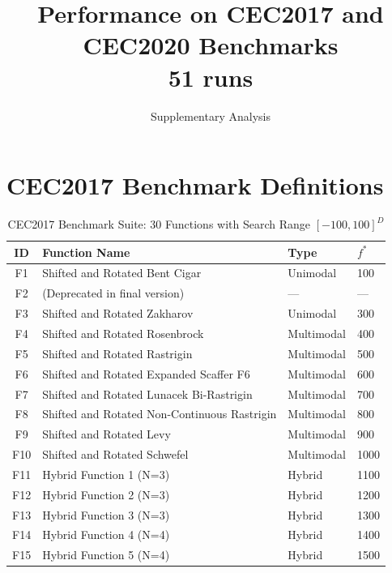 \documentclass[11pt]{article}
\title{Performance on CEC2017 and CEC2020 Benchmarks\\
\large 51 runs}
\author{Supplementary Analysis}
\date{}
\begin{document}
\maketitle


\section{CEC2017 Benchmark Definitions}

\begin{table}[ht]
\centering
\caption{CEC2017 Benchmark Suite: 30 Functions with Search Range $[-100, 100]^D$}
\label{tab:cec2017_functions}
\small
\begin{tabular}{@{}clll@{}}
\toprule
\textbf{ID} & \textbf{Function Name} & \textbf{Type} & \textbf{$f^*$} \\
\midrule
F1  & Shifted and Rotated Bent Cigar          & Unimodal      & 100  \\
F2  & (Deprecated in final version)           & ---           & ---  \\
F3  & Shifted and Rotated Zakharov            & Unimodal      & 300  \\
\midrule
F4  & Shifted and Rotated Rosenbrock          & Multimodal    & 400  \\
F5  & Shifted and Rotated Rastrigin           & Multimodal    & 500  \\
F6  & Shifted and Rotated Expanded Scaffer F6 & Multimodal    & 600  \\
F7  & Shifted and Rotated Lunacek Bi-Rastrigin& Multimodal    & 700  \\
F8  & Shifted and Rotated Non-Continuous Rastrigin & Multimodal & 800  \\
F9  & Shifted and Rotated Levy                & Multimodal    & 900  \\
F10 & Shifted and Rotated Schwefel            & Multimodal    & 1000 \\
\midrule
F11 & Hybrid Function 1 (N=3)                 & Hybrid        & 1100 \\
F12 & Hybrid Function 2 (N=3)                 & Hybrid        & 1200 \\
F13 & Hybrid Function 3 (N=3)                 & Hybrid        & 1300 \\
F14 & Hybrid Function 4 (N=4)                 & Hybrid        & 1400 \\
F15 & Hybrid Function 5 (N=4)                 & Hybrid        & 1500 \\

\end{tabular}
\end{table}
\end{document}
